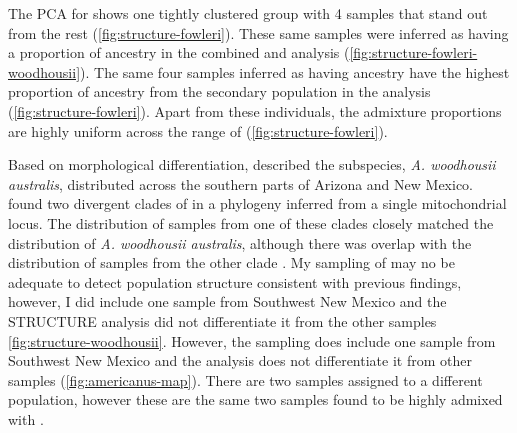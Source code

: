 The PCA for \fowl shows one tightly clustered group with 4 samples that 
stand out from the rest (\cref{fig:structure-fowleri}).
These same samples were inferred as having 
a proportion of \wood ancestry in the combined \fowl and \wood \structure 
analysis (\cref{fig:structure-fowleri-woodhousii}). 
The same four samples inferred as having \wood ancestry have the highest 
proportion of ancestry from the secondary population in the \fowl \structure 
analysis (\cref{fig:structure-fowleri}).
Apart from these individuals, the admixture proportions 
are highly uniform across the range of \fowl (\cref{fig:structure-fowleri}).  

Based on morphological differentiation, \textcite{shannon1955} described the 
subspecies, \textit{A. woodhousii australis}, distributed across the southern parts of 
Arizona and New Mexico.
\textcite{masta2003} found two divergent clades of \wood in a phylogeny inferred 
from a single mitochondrial locus. 
The distribution of samples from one of these clades closely matched the distribution
of \textit{A. woodhousii australis}, although there was overlap with the distribution 
of samples from the other clade \textcite{shannon1955,masta2003}.
My sampling of \wood may no be adequate to detect population structure 
consistent with previous findings, however, I did include one sample from 
Southwest New Mexico and the STRUCTURE analysis did not differentiate it from 
the other samples \cref{fig:structure-woodhousii}.
However, the sampling does include one sample from Southwest New Mexico 
and the \structure analysis does not differentiate it from other samples (\cref{fig:americanus-map}).
There are two samples assigned to a different population, however these are the 
same two samples found to be highly admixed with \fowl. 



